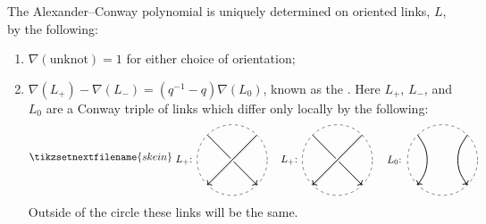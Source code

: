 \documentclass[fleqn]{NotesClass}
\begin{document}
    \begin{thm}{}{}
        The Alexander--Conway polynomial is uniquely determined on oriented links, \(L\), by the following:
        \begin{enumerate}
            \item \(\nabla(\text{unknot}) = 1\) for either choice of orientation;
            \item \(\nabla(L_+) - \nabla(L_-) = (q^{-1} - q)\nabla(L_0)\), known as the .
            Here \(L_+\), \(L_-\), and \(L_0\) are a Conway triple of links which differ only locally by the following:
            \begin{equation}
                \tikzsetnextfilename{skein}
                \begin{tikzpicture}[baseline=(current bounding box), scale=0.6]
                    \node at (-2.75, 0) {\(L_+\):};
                    \draw [dashed] (0, 0) circle [radius=2];
                    \draw [thick, ->] (135:2) -- (-45:2);
                    \draw [line width=1.5mm, black!5] (45:2) -- (-135:2);
                    \draw [thick, ->] (45:2) -- (-135:2);
                    
                    \begin{scope}[xshift=6cm]
                        \node at (-2.75, 0) {\(L_+\):};
                        \draw [thick, ->] (135:2) -- (-45:2);
                        \draw [line width=1.5mm, black!5] (45:2) -- (-135:2);
                        \draw [thick, ->] (45:2) -- (-135:2);
                        \draw [dashed] (0, 0) circle [radius=2];
                    \end{scope}
                    
                    \begin{scope}[xshift=12cm]
                        \node at (-2.75, 0) {\(L_0\):};
                        \draw [dashed] (0, 0) circle [radius=2];
                        \draw [thick, rounded corners=20, ->] (135:2) -- (-0.5, 0) -- (-135:2);
                        \draw [thick, rounded corners=20, ->] (45:2) -- (0.5, 0) -- (-45:2);
                    \end{scope}
                \end{tikzpicture}
            \end{equation}
            Outside of the circle these links will be the same.
        \end{enumerate}
    \end{thm}
    
\end{document}
